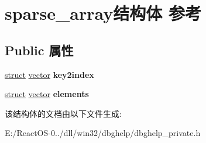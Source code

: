 \hypertarget{structsparse__array}{}\section{sparse\+\_\+array结构体 参考}
\label{structsparse__array}
\subsection*{Public 属性}
\begin{DoxyCompactItemize}
\item 
\mbox{\label{structsparse__array_ad39da4a6d7f507d7c07ed217286eea65}} 
\hyperlink{interfacestruct}{struct} \hyperlink{structvector}{vector} {\bfseries key2index}
\item 
\mbox{\label{structsparse__array_a669faaaa1cb193cb429df693f2239d0f}} 
\hyperlink{interfacestruct}{struct} \hyperlink{structvector}{vector} {\bfseries elements}
\end{DoxyCompactItemize}


该结构体的文档由以下文件生成\+:\begin{DoxyCompactItemize}
\item 
E\+:/\+React\+O\+S-\/0../dll/win32/dbghelp/dbghelp\+\_\+private.\+h\end{DoxyCompactItemize}
